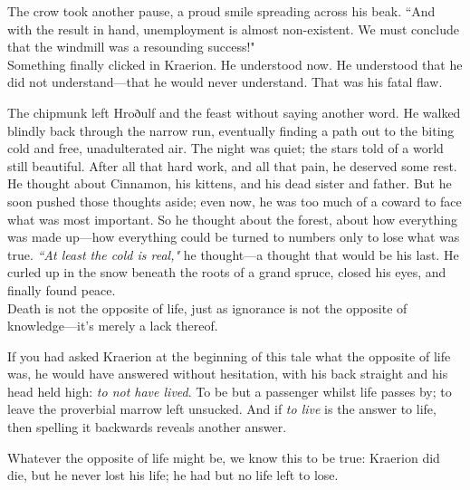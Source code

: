 The crow took another pause, a proud smile spreading across his beak.
``And with the result in hand, unemployment is almost non-existent.
We must conclude that the windmill was a resounding success!"\\

Something finally clicked in Kraerion.
He understood now.
He understood that he did not understand---that he would never understand.
That was his fatal flaw.

The chipmunk left Hroðulf and the feast without saying another word.
He walked blindly back through the narrow run, eventually finding a path out to the biting cold and free, unadulterated air.
The night was quiet; the stars told of a world still beautiful.
After all that hard work, and all that pain, he deserved some rest.
He thought about Cinnamon, his kittens, and his dead sister and father.
But he soon pushed those thoughts aside; even now, he was too much of a coward to face what was most important.
So he thought about the forest, about how everything was made up---how everything could be turned to numbers only to lose what was true.
\textit{``At least the cold is real,"} he thought---a thought that would be his last.
He curled up in the snow beneath the roots of a grand spruce, closed his eyes, and finally found peace. \\

Death is not the opposite of life, just as ignorance is not the opposite of knowledge---it's merely a lack thereof.

If you had asked Kraerion at the beginning of this tale what the opposite of life was, he would have answered without hesitation, with his back straight and his head held high: \textit{to not have lived}.
To be but a passenger whilst life passes by; to leave the proverbial marrow left unsucked.
And if \textit{to live} is the answer to life, then spelling it backwards reveals another answer.

Whatever the opposite of life might be, we know this to be true: Kraerion did die, but he never lost his life; he had but no life left to lose.

